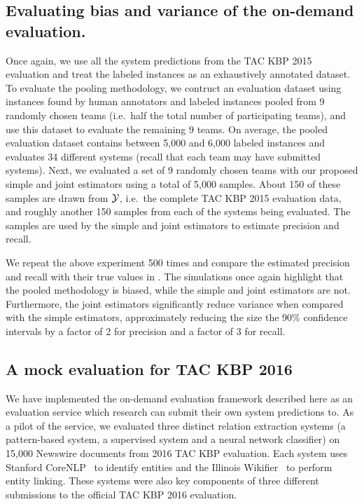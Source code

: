 \subsection{Evaluating bias and variance of the on-demand evaluation.}
Once again, we use all the system predictions from the TAC KBP 2015 evaluation and treat the labeled instances as an exhaustively annotated dataset.
To evaluate the pooling methodology, we contruct an evaluation dataset using
instances found by human annotators and labeled instances pooled from 9
randomly chosen teams (i.e.\ half the total number of participating teams), and
use this dataset to evaluate the remaining 9 teams.
On average, the pooled evaluation dataset contains between 5,000 and 6,000 labeled instances and evaluates 34 different systems (recall that each team may have submitted systems).
Next, we evaluated a set of 9 randomly chosen teams with our proposed simple and joint estimators using a total of 5,000 samples.
About 150 of these samples are drawn from $\mathcal{Y}$, i.e.\ the complete TAC KBP 2015 evaluation data, and roughly another 150 samples from each of the systems being evaluated.
The samples are used by the simple and joint estimators to estimate precision and recall.

We repeat the above experiment 500 times and compare the estimated precision and recall with their true values in .
The simulations once again highlight that the pooled methodology is biased, while the simple and joint estimators are not.
Furthermore, the joint estimators significantly reduce variance when compared with the simple estimators,
approximately reducing the size the 90\% confidence intervals by a factor of 2 for precision and a factor of 3 for recall.

\subsection{A mock evaluation for TAC KBP 2016}
We have implemented the on-demand evaluation framework described here as an evaluation service which research can submit their own system predictions to.
As a pilot of the service, we evaluated three distinct relation extraction systems (a pattern-based system, a supervised system and a neural network classifier) on 15,000 Newswire documents from 2016 TAC KBP evaluation.
Each system uses Stanford CoreNLP~\citep{manning2014stanford} to identify entities and the Illinois Wikifier~\citep{ratinov2011local} to perform entity linking. 
These systems were also key components of three different submissions to the official TAC KBP 2016 evaluation.


